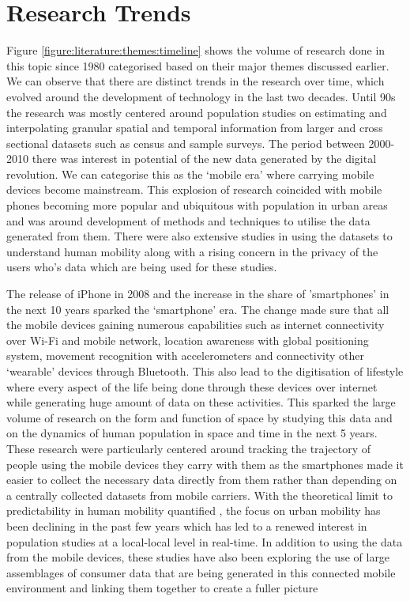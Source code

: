 \section{Research Trends}

Figure \ref{figure:literature:themes:timeline} shows the volume of research done in this topic since 1980 categorised based on their major themes discussed earlier.
We can observe that there are distinct trends in the research over time, which evolved around the development of technology in the last two decades.
Until 90s the research was mostly centered around population studies on estimating and interpolating granular spatial and temporal information from larger and cross sectional datasets such as census and sample surveys.
The period between 2000-2010 there was interest in potential of the new data generated by the digital revolution. 
We can categorise this as the `mobile era' where carrying mobile devices become mainstream.
This explosion of research coincided with mobile phones becoming more popular and ubiquitous with population in urban areas and was around development of methods and techniques to utilise the data generated from them.
There were also extensive studies in using the datasets to understand human mobility along with a rising concern in the privacy of the users who's data which are being used for these studies.

The release of iPhone in 2008 and the increase in the share of 'smartphones' in the next 10 years sparked the `smartphone' era. 
The change made sure that all the mobile devices gaining numerous capabilities such as internet connectivity over Wi-Fi and mobile network, location awareness with global positioning system, movement recognition with accelerometers and connectivity other `wearable' devices through Bluetooth.
This also lead to the digitisation of lifestyle where every aspect of the life being done through these devices over internet while generating huge amount of data on these activities.
This sparked the large volume of research on the form and function of space by studying this data and on the dynamics of human population in space and time in the next 5 years.
These research were particularly centered around tracking the trajectory of people using the mobile devices they carry with them as the smartphones made it easier to collect the necessary data directly from them rather than depending on a centrally collected datasets from mobile carriers. 
With the theoretical limit to predictability in human mobility quantified \cite{song2010limits}, the focus on urban mobility has been declining in the past few years which has led to a renewed interest in population studies at a local-local level in real-time.
In addition to using the data from the mobile devices, these studies have also been exploring the use of large assemblages of consumer data that are being generated in this connected mobile environment and linking them together to create a fuller picture \cite{cdrc2018}

